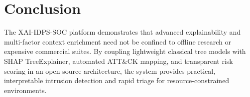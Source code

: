 \documentclass[conference]{IEEEtran}
\begin{document}
\section{Conclusion}
The XAI-IDPS-SOC platform demonstrates that advanced explainability and multi-factor context enrichment need not be confined to offline research or expensive commercial suites. By coupling lightweight classical tree models with SHAP TreeExplainer, automated ATT\&CK mapping, and transparent risk scoring in an open-source architecture, the system provides practical, interpretable intrusion detection and rapid triage for resource-constrained environments.



\end{document}
